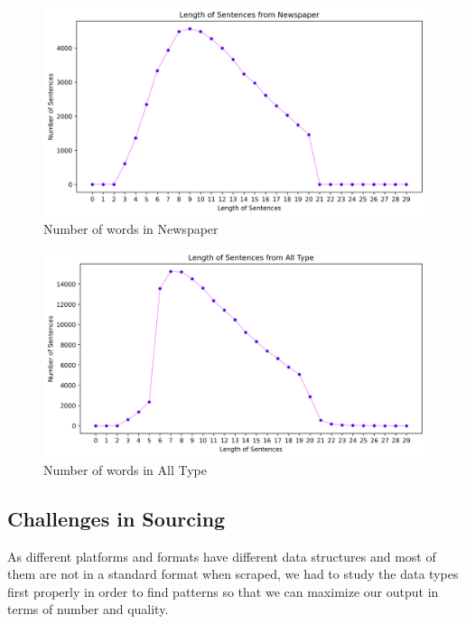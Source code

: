         \begin{figure}[h!]
            \centering
            \includegraphics[scale=.7]{Images/Graph/output4.png}
                \caption{Number of words in Newspaper}
            \label{fig: Number of words in Newspaper}
        \end{figure}
        
                    \begin{figure}[h!]
            \centering
            \includegraphics[scale=.7]{Images/Graph/output-all.png}
                \caption{Number of words in All Type}
            \label{fig: Number of words in All Type}
        \end{figure}

\subsection{Challenges in Sourcing}
As different platforms and formats have different data structures and most of them are not
in a standard format when scraped, we had to study the data types first properly in order
to find patterns so that we can maximize our output in terms of number and quality.

